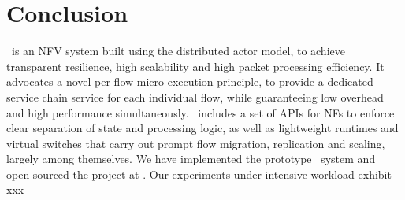 \section{Conclusion}
\label{sec:conclusion}

\nfactor~is an NFV system built using the distributed actor model, to achieve transparent resilience, high scalability and high packet processing efficiency. It advocates a novel per-flow micro execution principle, to provide a dedicated service chain service for each individual flow, while guaranteeing low overhead and high performance simultaneously. \nfactor~includes a set of APIs for NFs to enforce clear separation of state and processing logic, as well as lightweight runtimes and virtual switches that carry out prompt flow migration, replication and scaling, largely among themselves. We have implemented the prototype \nfactor~system and open-sourced the project at \cite{projectcode}. Our experiments under intensive workload exhibit xxx 

